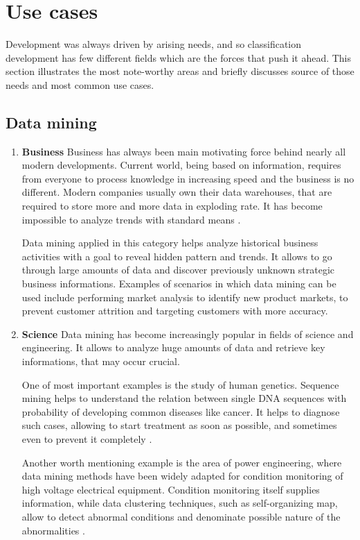 \section{Use cases}
	Development was always driven by arising needs, and so classification development has few different fields which are the forces that push it ahead. This section illustrates the most note-worthy areas and briefly discusses source of those needs and most common use cases.
	
	\subsection{Data mining}
		\begin{enumerate}
			\item \textbf{Business}
			Business has always been main motivating force behind nearly all modern developments. Current world, being based on information, requires from everyone to process knowledge in increasing speed and the business is no different. Modern companies usually own their data warehouses, that are required to store more and more data in exploding rate. It has become impossible to analyze trends with standard means \cite{data_mining_business}.
			
			Data mining applied in this category helps analyze historical business activities with a goal to reveal hidden pattern and trends. It allows to go through large amounts of data and discover previously unknown strategic business informations. Examples of scenarios in which data mining can be used include performing market analysis to identify new product markets, to prevent customer attrition and targeting customers with more accuracy.
				
			\item \textbf{Science}
			Data mining has become increasingly popular in fields of science and engineering. It allows to analyze huge amounts of data and retrieve key informations, that may occur crucial.
			
			One of most important examples is the study of human genetics. Sequence mining helps to understand the relation between single DNA sequences with probability of developing common diseases like cancer. It helps to diagnose such cases, allowing to start treatment as soon as possible, and sometimes even to prevent it completely \cite{data_mining_cancer}.
			
			Another worth mentioning example is the area of power engineering, where data mining methods have been widely adapted for condition monitoring of high voltage electrical equipment. Condition monitoring itself supplies information, while data clustering techniques, such as self-organizing map, allow to detect abnormal conditions and denominate possible nature of the abnormalities \cite{data_mining_electrical_abnormalities}.

		\end{enumerate}

